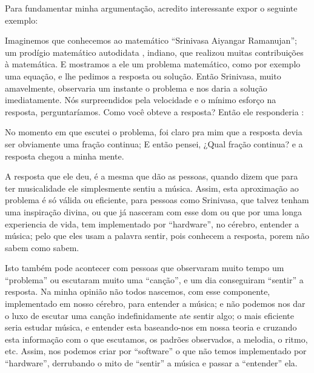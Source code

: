 Para fundamentar minha argumentação, acredito interessante expor o seguinte exemplo: 
\begin{example}
Imaginemos que conhecemos ao matemático ``Srinivasa Aiyangar Ramanujan'';
um prodígio matemático autodidata \cite[pp. 1]{kanigel2016man}, indiano, que 
realizou muitas contribuições à matemática.
E mostramos a ele um problema matemático, como por exemplo uma equação,
e  lhe pedimos a resposta ou solução. 
Então Srinivasa, muito amavelmente, 
observaria um instante o problema e nos daria a solução imediatamente.
Nós surpreendidos pela velocidade e o mínimo esforço na resposta,
perguntaríamos. Como você obteve a resposta? Então ele responderia \cite[pp. 235]{kanigel2016man}: 
\begin{citando}
No momento em que escutei o problema, 
foi claro pra mim que a resposta devia ser obviamente uma fração continua; 
E então pensei, ¿Qual fração continua? e a resposta chegou a minha mente. 
\end{citando}
\end{example}

A resposta que ele deu, 
é a mesma  que dão as pessoas, quando  dizem que para ter musicalidade ele simplesmente sentiu a música. 
Assim, esta aproximação ao problema é só válida ou eficiente, para pessoas como Srinivasa, 
que talvez tenham uma inspiração divina, 
ou que já nasceram com esse dom ou que por uma longa experiencia de vida, 
tem implementado por ``hardware'', no cérebro, entender a música; 
pelo que eles usam a palavra sentir, 
pois conhecem a resposta, porem não sabem como sabem. 

Isto também pode acontecer com pessoas que observaram muito tempo um ``problema'' ou escutaram muito uma ``canção'', 
e um dia conseguiram ``sentir'' a resposta. Na minha opinião não todos nascemos, 
com esse componente, implementado em nosso cérebro, para entender  a música; 
e não podemos nos dar o luxo de escutar uma canção indefinidamente ate sentir algo; 
o mais eficiente seria estudar música, 
e entender esta baseando-nos em nossa teoria e cruzando esta informação com o que escutamos, 
os padrões observados, a melodia, o ritmo, etc. 
Assim, nos podemos criar por ``software'' o que não temos implementado por ``hardware'', 
derrubando o mito de ``sentir'' a música e passar a ``entender'' ela.

